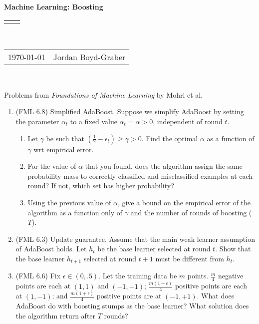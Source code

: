 \documentclass[12pt]{article}
\renewcommand{\title}[1]{\textbf{#1}\\}
\renewcommand{\line}{\begin{tabularx}{\textwidth}{X>{\raggedleft}X}\hline\\\end{tabularx}\\[-0.5cm]}
\newcommand{\leftright}[2]{\begin{tabularx}{\textwidth}{X>{\raggedleft}X}#1%
& #2\\\end{tabularx}\\[-0.5cm]}
\begin{document}
\title{Machine Learning: Boosting}
\line
\leftright{\today}{Jordan Boyd-Graber} %

\begin{center}
  Problems from \emph{Foundations of Machine Learning} by Mohri et al.
\end{center}

\begin{enumerate}
  \item (FML 6.8) Simplified AdaBoost.  Suppose we simplify AdaBoost by setting
    the parameter $\alpha_t$ to a fixed value $\alpha_t = \alpha> 0$,
    independent of round $t$.
    \begin{enumerate}
      \item Let $\gamma$ be such that $\left(\frac{1}{2} - \epsilon_t \right)
        \geq \gamma > 0$.  Find the optimal $\alpha$ as a function of $\gamma$
        wrt empirical error.

     \item For the value of $\alpha$ that you found, does the algorithm assign
       the same probability mass to correctly classified and misclassified
       examples at each round?  If not, which set has higher probability?

     \item Using the previous value of $\alpha$, give a bound on the empirical
       error of the algorithm as a function only of $\gamma$ and the number of
       rounds of boosting ($T$).
    \end{enumerate}

    \item (FML 6.3) Update guarantee.  Assume that the main weak learner assumption of
      AdaBoost holds.  Let $h_t$ be the base learner selected at round $t$.  Show
      that the base learner $h_{t+1}$ selected at round $t+1$ must be different
      from $h_t$.

    \item (FML 6.6) Fix $\epsilon \in (0, .5)$.  Let the training data be $m$
      points.  $\frac{m}{4}$ negative points are each at $(1,1)$ and
      $(-1, -1)$; $\frac{m (1 - \epsilon)}{4}$ positive points are each at $(1,
      -1)$; and $\frac{m (1 + \epsilon)}{4}$ positive points are at $(-1, +1)$.
      What does AdaBoost do with boosting stumps as the base learner?
      What solution does the algorithm return after $T$ rounds?

\end{enumerate}
\end{document}
